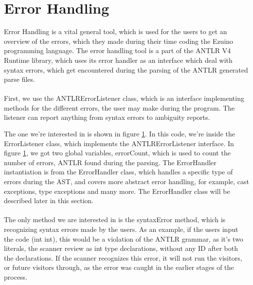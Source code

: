 \section{Error Handling}
Error Handling is a vital general tool, which is used for the users to get an overview of the errors, which they made during their time coding the Ezuino programming language. The error handling tool is a part of the ANTLR V4 Runtime library, which uses its error handler as an interface which deal with syntax errors, which get encountered during the parsing of the ANTLR generated parse files. \\
\\
First, we use the ANTLRErrorListener class, which is an interface implementing methods for the different errors, the user may make during the program. The listener can report anything from syntax errors to ambiguity reports.
\begin{figure}[H]
\centering
{}
\caption{}
\label{eh01}
\end{figure}
The one we’re interested in is shown in figure \ref{eh01}. In this code, we’re inside the ErrorListener class, which implements the ANTLRErrorListener interface.  In figure \ref{eh01}, we got two global variables, errorCount, which is used to count the number of errors, ANTLR found during the parsing. The ErrorHandler instantiation is from the ErrorHandler class, which handles a specific type of errors during the AST, and covers more abstract error handling, for example, cast exceptions, type exceptions and many more. The ErrorHandler class will be described later in this section. \\
\\
The only method we are interested in is the syntaxError method, which is recognizing syntax errors made by the users. As an example, if the users input the code (int int), this would be a violation of the ANTLR grammar, as it’s two literals, the scanner review as int type declarations, without any ID after both the declarations. If the scanner recognizes this error, it will not run the visitors, or future visitors through, as the error was caught in the earlier stages of the process.
